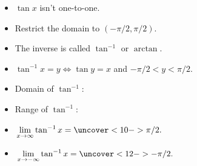 \begin{frame}
\begin{columns}[c]
\ %
%
%
\begin{itemize}
\item<1->  $\tan x$ isn't one-to-one.
\item<2->  Restrict the domain to $(-\pi /2, \pi /2)$.
\item<3->  The inverse is called $\tan^{-1}$ or $\arctan$.
\item<4->  $\tan^{-1} x = y \Leftrightarrow \tan y = x$ and $-\pi /2 < y < \pi /2$.
\item<5->  \alert<handout:0| 5-6>{Domain of $\tan^{-1}$: }
\item<5->  \alert<handout:0| 7-8>{Range of $\tan^{-1}$: }
\item<9->  \alert<handout:0| 9-10>{$\displaystyle \lim_{x\rightarrow \infty} \tan^{-1} x = \uncover<10->{\pi / 2.}$}
\item<9->  \alert<handout:0| 11-12>{$\displaystyle \lim_{x\rightarrow - \infty} \tan^{-1} x = \uncover<12->{- \pi / 2.}$}
\end{itemize}
\end{columns}
\end{frame}
